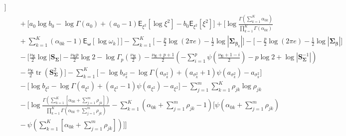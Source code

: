\begin{appendix}
\begin{itemize}
\begin{equation}
\begin{split}
\Bigg] \\
&\quad + \Bigg[
a_0\log b_0-\log\Gamma(a_0)
+(a_0-1)\mathsf{E}_{\xi^2}\left[\log\xi^2\right]
-b_0\mathsf{E}_{\xi^2}\left[\xi^2\right]
\Bigg] + \Bigg[ \log \frac{\Gamma\left( \sum_{k=1}^{K} \alpha_{0k} \right)}{\prod_{k=1}^{K} \Gamma(\alpha_{0k})}\\  
&\quad + \sum_{k=1}^{K}(\alpha_{0k}-1)\mathsf{E}_{\bm{\omega}}\left[\log\omega_k\right]\Bigg]
- \sum_{k=1}^{K}\Bigg[
-\tfrac{p}{2}\log(2\pi e)-\tfrac{1}{2}\log|\bm{\Sigma}_{\bm{\beta}_k}|
\Bigg] - \Bigg[
-\tfrac{p}{2}\log(2\pi e)-\tfrac{1}{2}\log|\bm{\Sigma}_{\bm{\beta}}|
\Bigg]\\
&\quad -\Bigg[\tfrac{\nu_{\bm{\Sigma}}}{2}\log|\mathbf{S}_{\bm{\Sigma}}|
- \tfrac{\nu_{\bm{\Sigma}} p}{2}\log 2
- \log\Gamma_p\left(\tfrac{\nu_{\bm{\Sigma}}}{2}\right) - \tfrac{\nu_{\bm{\Sigma}}+p+1}{2}\left(
-\sum_{i=1}^{p}\psi\left(\tfrac{\nu_{\bm{\Sigma}}+1-i}{2}\right)-p\log 2+\log|\mathbf{S}_{\bm{\Sigma}}^{-1}|
\right) \\ 
&\quad - \tfrac{\nu_{\bm{\Sigma}}}{2}\operatorname{tr}\left(\mathbf{S}_{\bm{\Sigma}}^2\right)\Bigg]- \sum_{k=1}^{K}\Bigg[
-\log b_{\sigma_k^2}-\log\Gamma(a_{\sigma_k^2})+(a_{\sigma_k^2}+1)\psi(a_{\sigma_k^2})-a_{\sigma_k^2}
\Bigg] \\
&\quad - \Bigg[
\log b_{\xi^2}-\log\Gamma(a_{\xi^2})+(a_{\xi^2}-1)\psi(a_{\xi^2})-a_{\xi^2}
\Bigg]  - \sum_{j=1}^{m}\sum_{k=1}^{K}\rho_{jk}\log\rho_{jk} \\
&\quad- \Bigg[
\log\frac{\Gamma\left( \sum_{k=1}^{K} \left[\alpha_{0k}+\sum_{j=1}^{m}\rho_{jk} \right]\right)}{\prod_{k=1}^{K} \Gamma\left(\alpha_{0k}+\sum_{j=1}^{m}\rho_{jk}\right)}-\sum_{k=1}^{K}\left(\alpha_{0k}+\sum_{j=1}^{m}\rho_{jk} -1\right)\Bigg[\psi\left(\alpha_{0k}+\sum_{j=1}^{m}\rho_{jk}\right) \\
&\quad-\psi\left(\sum_{k=1}^{K}\left[\alpha_{0k}+\sum_{j=1}^{m}\rho_{jk} \right]\right)\Bigg]\Bigg]
\end{split}
\end{equation}


\end{itemize}
\end{appendix}
